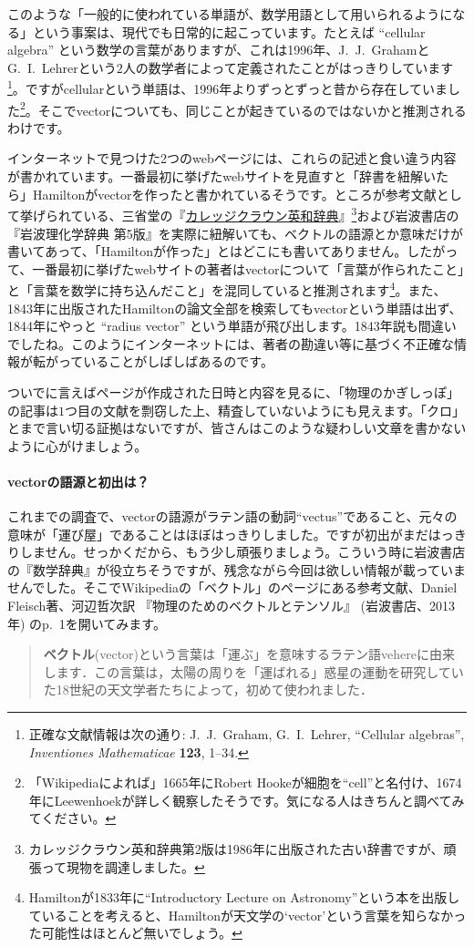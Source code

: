 このような「一般的に使われている単語が、数学用語として用いられるようになる」という事案は、現代でも日常的に起こっています。たとえば ``cellular algebra'' という数学の言葉がありますが、これは1996年、J.~J.~Grahamと G.~I.~Lehrerという$2$人の数学者によって定義されたことがはっきりしています\footnote{正確な文献情報は次の通り: J.~J.~Graham, G.~I.~Lehrer, ``Cellular algebras'', \textit{Inventiones Mathematicae} \textbf{123}, 1--34.}。ですがcellularという単語は、1996年よりずっとずっと昔から存在していました\footnote{「Wikipediaによれば」1665年にRobert Hookeが細胞を``cell''と名付け、1674年にLeewenhoekが詳しく観察したそうです。気になる人はきちんと調べてみてください。}。そこでvectorについても、同じことが起きているのではないかと推測されるわけです。

インターネットで見つけた2つのwebページには、これらの記述と食い違う内容が書かれています。一番最初に挙げたwebサイトを見直すと「辞書を紐解いたら」Hamiltonがvectorを作ったと書かれているそうです。ところが参考文献として挙げられている、三省堂の『\href{http://www.sanseido-publ.co.jp/sinagire/col_cr_ej.html}{カレッジクラウン英和辞典}』\footnote{カレッジクラウン英和辞典第2版は1986年に出版された古い辞書ですが、頑張って現物を調達しました。}および岩波書店の『岩波理化学辞典 第5版』を実際に紐解いても、ベクトルの語源とか意味だけが書いてあって、「Hamiltonが作った」とはどこにも書いてありません。したがって、一番最初に挙げたwebサイトの著者はvectorについて「言葉が作られたこと」と「言葉を数学に持ち込んだこと」を混同していると推測されます\footnote{Hamiltonが1833年に``Introductory Lecture on Astronomy''という本を出版していることを考えると、Hamiltonが天文学の`vector'という言葉を知らなかった可能性はほとんど無いでしょう。}。また、1843年に出版されたHamiltonの論文全部を検索してもvectorという単語は出ず、1844年にやっと ``radius vector'' という単語が飛び出します。1843年説も間違いでしたね。このようにインターネットには、著者の勘違い等に基づく不正確な情報が転がっていることがしばしばあるのです。

ついでに言えばページが作成された日時と内容を見るに、「物理のかぎしっぽ」の記事は$1$つ目の文献を剽窃した上、精査していないようにも見えます。「クロ」とまで言い切る証拠はないですが、皆さんはこのような疑わしい文章を書かないように心がけましょう。

\paragraph{vectorの語源と初出は？}

これまでの調査で、vectorの語源がラテン語の動詞``vectus''であること、元々の意味が「運び屋」であることはほぼはっきりしました。ですが初出がまだはっきりしません。せっかくだから、もう少し頑張りましょう。こういう時に岩波書店の『数学辞典』が役立ちそうですが、残念ながら今回は欲しい情報が載っていませんでした。そこでWikipediaの「ベクトル」のページにある参考文献、Daniel Fleisch著、河辺哲次訳 『物理のためのベクトルとテンソル』 (岩波書店、2013年) のp.~1を開いてみます。
\begin{quotation}
\textbf{ベクトル}(vector)という言葉は「運ぶ」を意味するラテン語vehereに由来します．この言葉は，太陽の周りを「運ばれる」惑星の運動を研究していた18世紀の天文学者たちによって，初めて使われました．
\end{quotation}

